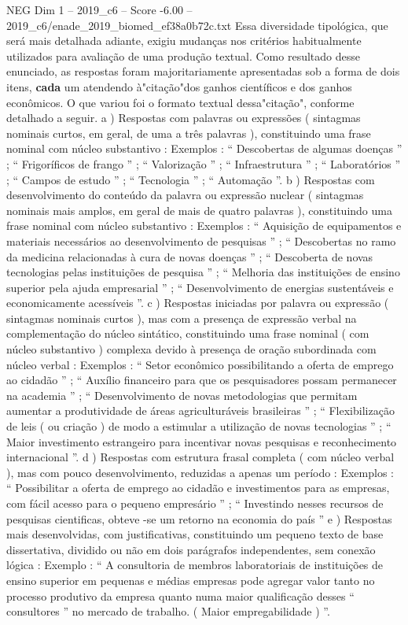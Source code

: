 \begin{textsample}{NEG Dim 1 – 2019\_c6 – Score -6.00 – 2019\_c6/enade\_2019\_biomed\_ef38a0b72c.txt}
Essa diversidade tipológica, que será mais detalhada adiante, exigiu mudanças nos critérios habitualmente utilizados para avaliação de uma produção textual.
Como resultado desse enunciado, as respostas foram majoritariamente apresentadas sob a forma de dois itens, \textbf{cada} um atendendo à"citação"dos ganhos científicos e dos ganhos econômicos.
O que variou foi o formato textual dessa"citação", conforme detalhado a seguir. a ) Respostas com palavras ou expressões ( sintagmas nominais curtos, em geral, de uma a três palavras ), constituindo uma frase nominal com núcleo substantivo : Exemplos : “ Descobertas de algumas doenças ” ; “ Frigoríficos de frango ” ; “ Valorização ” ; “ Infraestrutura ” ; “ Laboratórios ” ; “ Campos de estudo ” ; “ Tecnologia ” ; “ Automação ”. b ) Respostas com desenvolvimento do conteúdo da palavra ou expressão nuclear ( sintagmas nominais mais amplos, em geral de mais de quatro palavras ), constituindo uma frase nominal com núcleo substantivo : Exemplos : “ Aquisição de equipamentos e materiais necessários ao desenvolvimento de pesquisas ” ; “ Descobertas no ramo da medicina relacionadas à cura de novas doenças ” ; “ Descoberta de novas tecnologias pelas instituições de pesquisa ” ; “ Melhoria das instituições de ensino superior pela ajuda empresarial ” ; “ Desenvolvimento de energias sustentáveis e economicamente acessíveis ”. c ) Respostas iniciadas por palavra ou expressão ( sintagmas nominais curtos ), mas com a presença de expressão verbal na complementação do núcleo sintático, constituindo uma frase nominal ( com núcleo substantivo ) complexa devido à presença de oração subordinada com núcleo verbal : Exemplos : “ Setor econômico possibilitando a oferta de emprego ao cidadão ” ; “ Auxílio financeiro para que os pesquisadores possam permanecer na academia ” ; “ Desenvolvimento de novas metodologias que permitam aumentar a produtividade de áreas agriculturáveis brasileiras ” ; “ Flexibilização de leis ( ou criação ) de modo a estimular a utilização de novas tecnologias ” ; “ Maior investimento estrangeiro para incentivar novas pesquisas e reconhecimento internacional ”. d ) Respostas com estrutura frasal completa ( com núcleo verbal ), mas com pouco desenvolvimento, reduzidas a apenas um período : Exemplos : “ Possibilitar a oferta de emprego ao cidadão e investimentos para as empresas, com fácil acesso para o pequeno empresário ” ; “ Investindo nesses recursos de pesquisas cientificas, obteve -se um retorno na economia do país ” e ) Respostas mais desenvolvidas, com justificativas, constituindo um pequeno texto de base dissertativa, dividido ou não em dois parágrafos independentes, sem conexão lógica : Exemplo : “ A consultoria de membros laboratoriais de instituições de ensino superior em pequenas e médias empresas pode agregar valor tanto no processo produtivo da empresa quanto numa maior qualificação desses “ consultores ” no mercado de trabalho. ( Maior empregabilidade ) ”.

\end{textsample}
